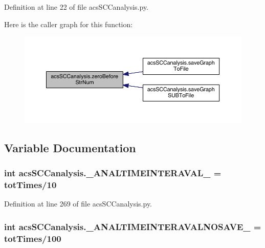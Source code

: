 Definition at line 22 of file acs\-S\-C\-Canalysis.\-py.



Here is the caller graph for this function\-:
\nopagebreak
\begin{figure}[H]
\begin{center}
\leavevmode
\includegraphics[width=350pt]{a00102_ab46df2a2027edcf1b07fc012b691b9d6_icgraph}
\end{center}
\end{figure}




\subsection{Variable Documentation}
\hypertarget{a00102_a46f1fb71bdcdb1c8679ae847d0d4b63f}{
\subsubsection[{\-\_\-\-A\-N\-A\-L\-T\-I\-M\-E\-I\-N\-T\-E\-R\-A\-V\-A\-L\-\_\-}]{\setlength{\rightskip}{0pt plus 5cm}int acs\-S\-C\-Canalysis.\-\_\-\-A\-N\-A\-L\-T\-I\-M\-E\-I\-N\-T\-E\-R\-A\-V\-A\-L\-\_\- = {\bf tot\-Times}/10}}\label{a00102_a46f1fb71bdcdb1c8679ae847d0d4b63f}


Definition at line 269 of file acs\-S\-C\-Canalysis.\-py.

\hypertarget{a00102_a7665e828ed7f27f4ba353e9645ad716d}{
\subsubsection[{\-\_\-\-A\-N\-A\-L\-T\-I\-M\-E\-I\-N\-T\-E\-R\-A\-V\-A\-L\-N\-O\-S\-A\-V\-E\-\_\-}]{\setlength{\rightskip}{0pt plus 5cm}int acs\-S\-C\-Canalysis.\-\_\-\-A\-N\-A\-L\-T\-I\-M\-E\-I\-N\-T\-E\-R\-A\-V\-A\-L\-N\-O\-S\-A\-V\-E\-\_\- = {\bf tot\-Times}/100}}\label{a00102_a7665e828ed7f27f4ba353e9645ad716d}


